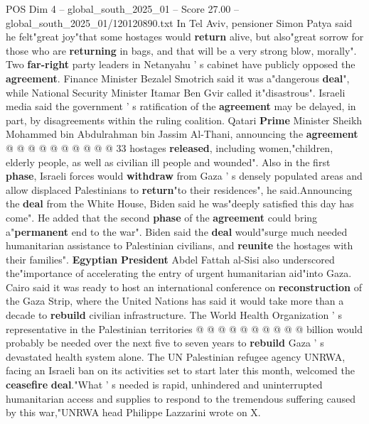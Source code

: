 \begin{textsample}{POS Dim 4 – global\_south\_2025\_01 – Score 27.00 – global\_south\_2025\_01/120120890.txt}
In Tel Aviv, pensioner Simon Patya said he felt"great joy"that some hostages would \textbf{return} alive, but also"great sorrow for those who are \textbf{returning} in bags, and that will be a very strong blow, morally".
Two \textbf{far-right} party leaders in Netanyahu ' s cabinet have publicly opposed the \textbf{agreement}.
Finance Minister Bezalel Smotrich said it was a"dangerous \textbf{deal}", while National Security Minister Itamar Ben Gvir called it"disastrous".
Israeli media said the government ' s ratification of the \textbf{agreement} may be delayed, in part, by disagreements within the ruling coalition.
Qatari \textbf{Prime} Minister Sheikh Mohammed bin Abdulrahman bin Jassim Al-Thani, announcing the \textbf{agreement} @ @ @ @ @ @ @ @ @ @ 33 hostages \textbf{released}, including women,"children, elderly people, as well as civilian ill people and wounded".
Also in the first \textbf{phase}, Israeli forces would \textbf{withdraw} from Gaza ' s densely populated areas and allow displaced Palestinians to \textbf{return}"to their residences", he said.Announcing the \textbf{deal} from the White House, Biden said he was"deeply satisfied this day has come".
He added that the second \textbf{phase} of the \textbf{agreement} could bring a"\textbf{permanent} end to the war".
Biden said the \textbf{deal} would"surge much needed humanitarian assistance to Palestinian civilians, and \textbf{reunite} the hostages with their families". \textbf{Egyptian} \textbf{President} Abdel Fattah al-Sisi also underscored the"importance of accelerating the entry of urgent humanitarian aid"into Gaza.
Cairo said it was ready to host an international conference on \textbf{reconstruction} of the Gaza Strip, where the United Nations has said it would take more than a decade to \textbf{rebuild} civilian infrastructure.
The World Health Organization ' s representative in the Palestinian territories @ @ @ @ @ @ @ @ @ @ billion would probably be needed over the next five to seven years to \textbf{rebuild} Gaza ' s devastated health system alone.
The UN Palestinian refugee agency UNRWA, facing an Israeli ban on its activities set to start later this month, welcomed the \textbf{ceasefire} \textbf{deal}."What ' s needed is rapid, unhindered and uninterrupted humanitarian access and supplies to respond to the tremendous suffering caused by this war,"UNRWA head Philippe Lazzarini wrote on X.

\end{textsample}
